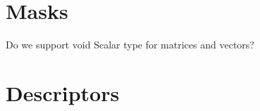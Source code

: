 \section{Masks}
\label{Sec:Masks}

Do we support void Scalar type for matrices and vectors?

\section{Descriptors}
\label{Sec:Descriptors}

